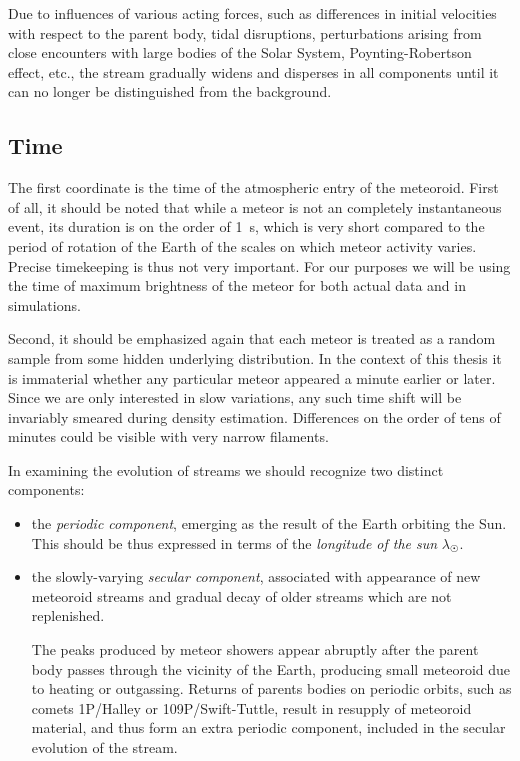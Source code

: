     Due to influences of various acting forces, such as differences
    in initial velocities with respect to the parent body, tidal disruptions,
    perturbations arising from close encounters with large bodies of the Solar System,
    Poynting-Robertson effect, etc., the stream
    gradually widens and disperses in all components until it can no longer be distinguished from the background.

    \subsection{Time} \label{iot}
        The first coordinate is the time of the atmospheric entry of the meteoroid.
        First of all, it should be noted that while a meteor is not an completely instantaneous event,
        its duration is on the order of \SI{1}{\second}, which is very short compared to the
        period of rotation of the Earth of the scales on which meteor activity varies.
        Precise timekeeping is thus not very important.
        For our purposes we will be using the time of maximum brightness
        of the meteor for both actual data and in simulations.

        Second, it should be emphasized again that each meteor is treated
        as a random sample from some hidden underlying distribution.
        In the context of this thesis it is immaterial whether any particular meteor
        appeared a minute earlier or later. Since we are only interested in slow variations,
        any such time shift will be invariably smeared during density estimation.
        Differences on the order of tens of minutes could be visible with very narrow filaments.

        In examining the evolution of streams we should recognize two distinct components:
        \begin{itemize}
            \item the \emph{periodic component}, emerging as the result of the Earth orbiting the Sun.
                This should be thus expressed in terms of the \emph{longitude of the sun} $\lambda_\Sun$.

            \item the slowly-varying \emph{secular component}, associated with appearance of new meteoroid streams and gradual decay of older
                streams which are not replenished.

                The peaks produced by meteor showers appear abruptly after the parent body passes through the vicinity of the Earth,
                producing small meteoroid due to heating or outgassing.
                Returns of parents bodies on periodic orbits, such as comets 1P/Halley or 109P/Swift-Tuttle, result
                in resupply of meteoroid material, and thus form an extra periodic component, included in the secular evolution of the stream.
        \end{itemize}

